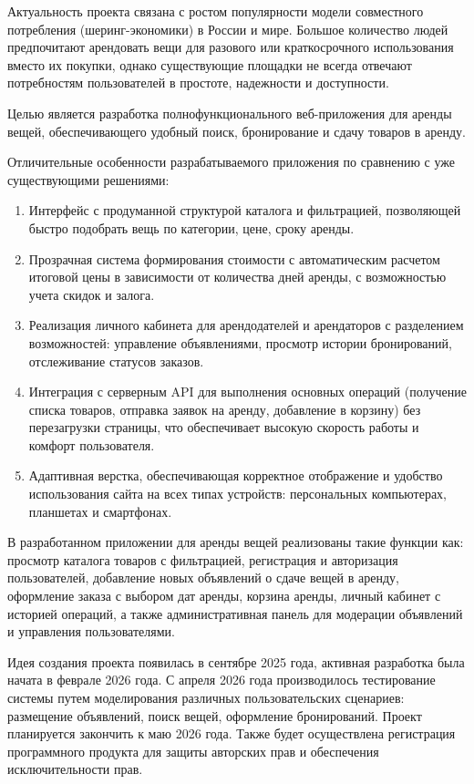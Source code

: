Актуальность проекта связана с ростом популярности модели совместного потребления (шеринг-экономики) в России и мире. Большое количество людей предпочитают арендовать вещи для разового или краткосрочного использования вместо их покупки, однако существующие площадки не всегда отвечают потребностям пользователей в простоте, надежности и доступности.

Целью является разработка полнофункционального веб-приложения для аренды вещей, обеспечивающего удобный поиск, бронирование и сдачу товаров в аренду.

Отличительные особенности разрабатываемого приложения по сравнению с уже существующими решениями:
\begin{enumerate}
	\item Интерфейс с продуманной структурой каталога и фильтрацией, позволяющей быстро подобрать вещь по категории, цене, сроку аренды.
	
	\item Прозрачная система формирования стоимости с автоматическим расчетом итоговой цены в зависимости от количества дней аренды, с возможностью учета скидок и залога.
	
	\item Реализация личного кабинета для арендодателей и арендаторов с разделением возможностей: управление объявлениями, просмотр истории бронирований, отслеживание статусов заказов.
	
	\item Интеграция с серверным API для выполнения основных операций (получение списка товаров, отправка заявок на аренду, добавление в корзину) без перезагрузки страницы, что обеспечивает высокую скорость работы и комфорт пользователя.
	
	\item Адаптивная верстка, обеспечивающая корректное отображение и удобство использования сайта на всех типах устройств: персональных компьютерах, планшетах и смартфонах.
\end{enumerate}

В разработанном приложении для аренды вещей реализованы такие функции как: просмотр каталога товаров с фильтрацией, регистрация и авторизация пользователей, добавление новых объявлений о сдаче вещей в аренду, оформление заказа с выбором дат аренды, корзина аренды, личный кабинет с историей операций, а также административная панель для модерации объявлений и управления пользователями.

Идея создания проекта появилась в сентябре 2025 года, активная разработка была начата в феврале 2026 года. С апреля 2026 года производилось тестирование системы путем моделирования различных пользовательских сценариев: размещение объявлений, поиск вещей, оформление бронирований. Проект планируется закончить к маю 2026 года. Также будет осуществлена регистрация программного продукта для защиты авторских прав и обеспечения исключительности прав.


